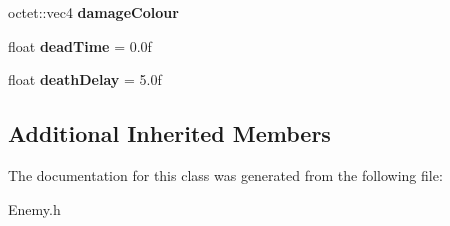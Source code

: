 \begin{DoxyCompactItemize}
\item 
\hypertarget{class_arena_1_1_enemy_a87ac19a8345ced47f23d540751b436ce}{octet\+::vec4 {\bfseries damage\+Colour}}\label{class_arena_1_1_enemy_a87ac19a8345ced47f23d540751b436ce}

\item 
\hypertarget{class_arena_1_1_enemy_a9679a4f0c4bab16a68f34ff93ed4671b}{float {\bfseries dead\+Time} = 0.\+0f}\label{class_arena_1_1_enemy_a9679a4f0c4bab16a68f34ff93ed4671b}

\item 
\hypertarget{class_arena_1_1_enemy_a36c89279f8a207f9289ad2d69125aa29}{float {\bfseries death\+Delay} = 5.\+0f}\label{class_arena_1_1_enemy_a36c89279f8a207f9289ad2d69125aa29}

\end{DoxyCompactItemize}
\subsection*{Additional Inherited Members}


The documentation for this class was generated from the following file\+:\begin{DoxyCompactItemize}
\item 
Enemy.\+h\end{DoxyCompactItemize}
